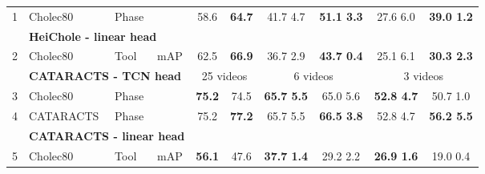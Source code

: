 \documentclass[times,twocolumn,final]{elsarticle}
\begin{document}
\begin{table*}[]
\begin{tabular}{llllcccccc}
1                                                     & \cellcolor[HTML]{C0C0C0}Cholec80    & \cellcolor[HTML]{00D2CB}Phase        & \cellcolor[HTML]{FFCCC9}                        & 58.6                 & \textbf{64.7}        & 41.7  4.7       & \textbf{51.1  3.3}          & 27.6  6.0       & \textbf{39.0  1.2}          \\
                                                      & \multicolumn{3}{l}{\textbf{HeiChole - linear head}}                                                                             &                      &                      &                      &                         &                      &                         \\
2                                                     & \cellcolor[HTML]{C0C0C0}Cholec80    & \cellcolor[HTML]{00D2CB}Tool         & \cellcolor[HTML]{FFCCC9}mAP                        & 62.5                 & \textbf{66.9}        & 36.7  2.9       & \textbf{43.7  0.4} & 25.1  6.1       & \textbf{30.3  2.3}          \\\hline
& \multicolumn{3}{l}{\textbf{CATARACTS - TCN head}} & \multicolumn{2}{c}{25 videos} & \multicolumn{2}{c}{6 videos}    & \multicolumn{2}{c}{3 videos}\\
3                                                     & \cellcolor[HTML]{C0C0C0}Cholec80    & \cellcolor[HTML]{00D2CB}Phase        & \cellcolor[HTML]{FFCCC9}                       & \textbf{75.2}                 & 74.5                  & \textbf{65.7  5.5}                  & 65.0  5.6                     & \textbf{52.8  4.7}                  &    50.7  1.0                  \\
4                                                     & \cellcolor[HTML]{C0C0C0}CATARACTS   & \cellcolor[HTML]{00D2CB}Phase        & \cellcolor[HTML]{FFCCC9}                       & 75.2                 & \textbf{77.2}                 & 65.7  5.5       & \textbf{66.5  3.8} & 52.8  4.7       & \textbf{56.2  5.5} \\
                                                      & \multicolumn{3}{l}{\textbf{CATARACTS - linear head}}                                                                            &                      &                      &                      &                         &                      &                         \\
5                                                     & \cellcolor[HTML]{C0C0C0}Cholec80    & \cellcolor[HTML]{00D2CB}Tool         & \cellcolor[HTML]{FFCCC9}mAP                        & \textbf{56.1}                 & 47.6                  & \textbf{37.7  1.4}                  & 29.2  2.2                     & \textbf{26.9  1.6}                  & 19.0  0.4                     \\

\end{tabular}
\end{table*}
\end{document}
